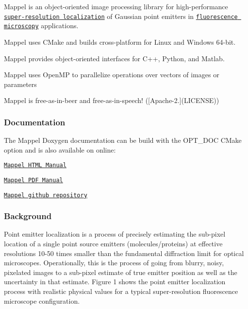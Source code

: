Mappel is an object-\/oriented image processing library for high-\/performance \href{https://en.wikipedia.org/wiki/Super-resolution_microscopy#Localization_microscopy}{\tt super-\/resolution localization} of Gaussian point emitters in \href{https://en.wikipedia.org/wiki/Fluorescence_microscope#Sub-diffraction_techniques}{\tt fluorescence microscopy} applications.
\begin{DoxyItemize}
\item Mappel uses C\+Make and builds cross-\/platform for Linux and Windows 64-\/bit.
\item Mappel provides object-\/oriented interfaces for C++, Python, and Matlab.
\item Mappel uses Open\+MP to parallelize operations over vectors of images or parameters
\item Mappel is free-\/as-\/in-\/beer and free-\/as-\/in-\/speech! (\mbox{[}Apache-\/2.\mbox{]}(L\+I\+C\+E\+N\+SE))
\end{DoxyItemize}

\subsubsection*{Documentation}

The Mappel Doxygen documentation can be build with the {\ttfamily O\+P\+T\+\_\+\+D\+OC} C\+Make option and is also available on online\+:
\begin{DoxyItemize}
\item \href{https://markjolah.github.io/Mappel/index.html}{\tt Mappel H\+T\+ML Manual}
\item \href{https://markjolah.github.io/Mappel/pdf/Mappel-0.0.3-reference.pdf}{\tt Mappel P\+DF Manual}
\item \href{https://github.com/markjolah/Mappel}{\tt Mappel github repository}
\end{DoxyItemize}

\subsubsection*{Background}

Point emitter localization is a process of precisely estimating the sub-\/pixel location of a single point source emitters (molecules/proteins) at effective resolutions 10-\/50 times smaller than the fundamental diffraction limit for optical microscopes. Operationally, this is the process of going from blurry, noisy, pixelated images to a sub-\/pixel estimate of true emitter position as well as the uncertainty in that estimate. Figure 1 shows the point emitter localization process with realistic physical values for a typical super-\/resolution fluorescence microscope configuration.

